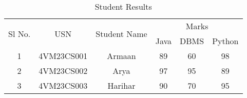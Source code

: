\documentclass{article}
\begin{document}
	\begin{table}
		\caption{Student Results}
		\centering
		\begin{tabular}{|c|c|c|c|c|c|}
			\hline
			\multirow{2}{*}{Sl No.} & \multirow{2}{*}{USN} & \multirow{2}{*}{Student Name} & \multicolumn{3}{|c|}{Marks} \\
			\cline{4-6} &&& Java & DBMS & Python \\
			\hline
			1 & 4VM23CS001 & Armaan & 89 & 60 & 98 \\
			\hline
			2 & 4VM23CS002 & Arya & 97 & 95 & 89 \\
			\hline
			3 & 4VM23CS003 & Harihar & 90 & 70 & 95 \\
			\hline
		\end{tabular}
	\end{table}
\end{document}
